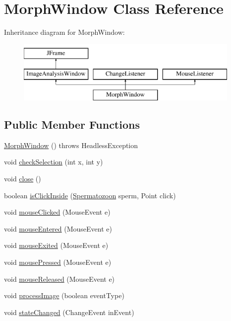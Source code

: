 \hypertarget{classgui_1_1_morph_window}{}\section{Morph\+Window Class Reference}
\label{classgui_1_1_morph_window}
Inheritance diagram for Morph\+Window\+:\begin{figure}[H]
\begin{center}
\leavevmode
\includegraphics[height=3.000000cm]{classgui_1_1_morph_window}
\end{center}
\end{figure}
\subsection*{Public Member Functions}
\begin{DoxyCompactItemize}
\item 
\hyperlink{classgui_1_1_morph_window_a4100873aa2e4bc183cd06aefb7719448}{Morph\+Window} ()  throws Headless\+Exception 
\item 
void \hyperlink{classgui_1_1_morph_window_a7ea2b90728ffa99304e7d2585376a374}{check\+Selection} (int x, int y)
\item 
void \hyperlink{classgui_1_1_morph_window_a5ae591df94fc66ccb85cbb6565368bca}{close} ()
\item 
boolean \hyperlink{classgui_1_1_morph_window_aab859aa1fe697dc9361ea47ccc6a80a5}{is\+Click\+Inside} (\hyperlink{classdata_1_1_spermatozoon}{Spermatozoon} sperm, Point click)
\item 
void \hyperlink{classgui_1_1_morph_window_a45d56bd84238e8b56589dfc732e2b2cf}{mouse\+Clicked} (Mouse\+Event e)
\item 
void \hyperlink{classgui_1_1_morph_window_a74e5095765312765f33ed268095a2cb2}{mouse\+Entered} (Mouse\+Event e)
\item 
void \hyperlink{classgui_1_1_morph_window_aa14a60f36cdd6abc1d90ce56d39218eb}{mouse\+Exited} (Mouse\+Event e)
\item 
void \hyperlink{classgui_1_1_morph_window_aed82e1ce3dd3cf283d508c3ba3be70ef}{mouse\+Pressed} (Mouse\+Event e)
\item 
void \hyperlink{classgui_1_1_morph_window_a87a07291794e15052db67f945d90853e}{mouse\+Released} (Mouse\+Event e)
\item 
void \hyperlink{classgui_1_1_morph_window_a92de44ef00adbefce701ecb95b7d926b}{process\+Image} (boolean event\+Type)
\item 
void \hyperlink{classgui_1_1_morph_window_ad9b473bf04acd35b39c38bc7774ed52a}{state\+Changed} (Change\+Event in\+Event)
\end{DoxyCompactItemize}
